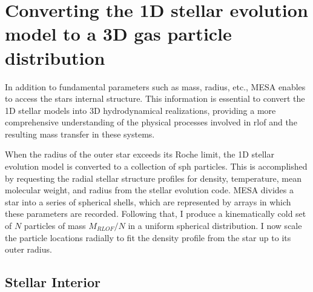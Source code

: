 \section{Converting the 1D stellar evolution model to a 3D gas particle distribution}\label{sec:1D_to_3D}

In addition to fundamental parameters such as mass, radius, etc., MESA enables to access the stars internal structure. This information is essential to convert the 1D stellar models into 3D hydrodynamical realizations, providing a more comprehensive understanding of the physical processes involved in \ac{rlof} and the resulting mass transfer in these systems.

When the radius of the outer star exceeds its Roche limit, the 1D stellar evolution model is converted to a collection of \ac{sph} particles. This is accomplished by requesting the radial stellar structure profiles for density, temperature, mean molecular weight, and radius from the stellar evolution code. MESA divides a star into a series of spherical shells, which are represented by arrays in which these parameters are recorded. Following that, I produce a kinematically cold set of $N$ particles of mass $M_{RLOF}/N$ in a uniform spherical distribution. I now scale the particle locations radially to fit the density profile from the star up to its outer radius.

\subsection{Stellar Interior}\label{sub:core}

